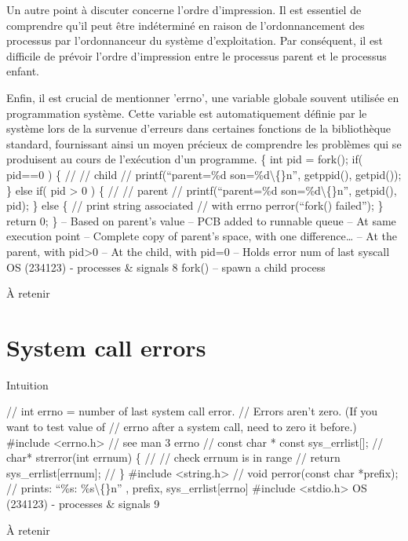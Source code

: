 \documentclass[12pt]{article}
\begin{document}
Un autre point à discuter concerne l'ordre d'impression. Il est essentiel de comprendre qu'il peut être indéterminé en raison de l'ordonnancement des processus par l'ordonnanceur du système d'exploitation. Par conséquent, il est difficile de prévoir l'ordre d'impression entre le processus parent et le processus enfant.

Enfin, il est crucial de mentionner 'errno', une variable globale souvent utilisée en programmation système. Cette variable est automatiquement définie par le système lors de la survenue d'erreurs dans certaines fonctions de la bibliothèque standard, fournissant ainsi un moyen précieux de comprendre les problèmes qui se produisent au cours de l'exécution d'un programme.
\{
int pid = fork();
if( pid==0 ) \{
//
// child
//
printf(“parent=\%d son=\%d\textbackslash\{\}n”,
getppid(), getpid());
\}
else if( pid > 0 ) \{
//
// parent
//
printf(“parent=\%d son=\%d\textbackslash\{\}n”,
getpid(), pid);
\}
else \{ // print string associated
// with errno
perror(“fork() failed”);
\}
return 0;
\}
– Based on parent’s value
– PCB added to runnable queue
– At same execution point
– Complete copy of parent’s
space, with one difference…
– At the parent, with pid>0
– At the child, with pid=0
– Holds error num of last syscall
OS (234123) - processes \& signals
8
fork() – spawn a child process
\begin{aretenir}{À retenir}
\end{aretenir}

\section{System call errors}
\begin{myvulga}{Intuition}
\end{myvulga}
// int errno = number of last system call error.
// Errors aren’t zero. (If you want to test value of
// errno after a system call, need to zero it before.)
\#include <errno.h> // see man 3 errno
// const char * const sys\_errlist[];
// char* strerror(int errnum) \{
//
// check errnum is in range
//
return sys\_errlist[errnum];
// \}
\#include <string.h>
//  void perror(const char *prefix);
// prints: “\%s: \%s\textbackslash\{\}n” , prefix, sys\_errlist[errno]
\#include <stdio.h>
OS (234123) - processes \& signals
9
\begin{aretenir}{À retenir}
\end{aretenir}
\end{document}
